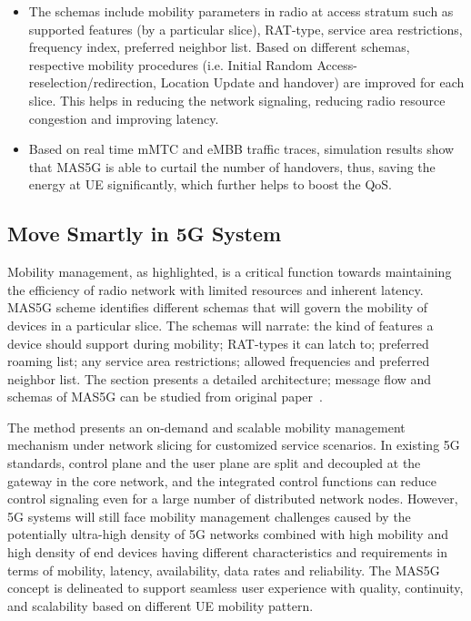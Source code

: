 \begin{multicols}{2}
\begin{itemize}
\item The schemas include mobility parameters in radio at access stratum such as supported features (by a particular slice), RAT-type, service area restrictions, frequency index, preferred neighbor list. Based on different schemas, respective mobility procedures (i.e. Initial Random Access-reselection/redirection, Location Update and handover) are improved for each slice. This helps in reducing the network signaling, reducing radio resource congestion and improving latency. 

\item Based on real time mMTC and eMBB traffic traces, simulation results show that MAS5G is able to curtail the number of handovers, thus, saving the energy at UE significantly, which further helps to boost the QoS.

\end{itemize}

\subsection{Move Smartly in 5G System} 

Mobility management, as highlighted, is a critical function towards maintaining the efficiency of radio network with limited resources and inherent latency. MAS5G scheme identifies different schemas that will govern the mobility of devices in a particular slice. The schemas will narrate: the kind of features a device should support during mobility; RAT-types it can latch to; preferred roaming list; any service area restrictions; allowed frequencies  and preferred neighbor list. The section presents a detailed architecture; message flow and schemas of MAS5G can be studied from original \hbox{paper \cite{art1-key01}.}

The method presents an on-demand and scalable mobility management mechanism under network slicing for customized service scenarios. In existing 5G standards, control plane and the user plane are split and decoupled at the gateway in the core network, and the integrated control functions can reduce control signaling even for a large number of distributed network nodes. However, 5G systems will still face mobility management challenges caused by the potentially ultra-high density of 5G networks combined with high mobility and high density of end devices having different characteristics and requirements in terms of mobility, latency, availability, data rates and reliability. The MAS5G concept is delineated to support seamless user experience with quality, continuity, and scalability based on different UE mobility pattern.


\end{multicols}
